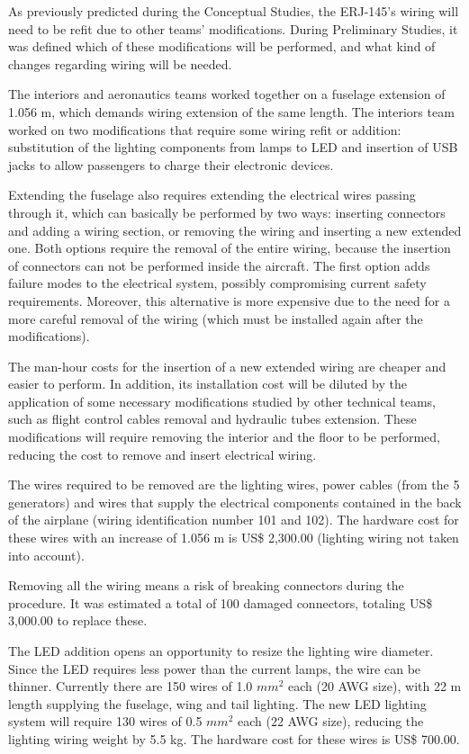 As previously predicted during the Conceptual Studies, the ERJ-145's wiring will need to be refit due to other teams' modifications. During Preliminary Studies, it was defined which of these modifications will be performed, and what kind of changes regarding wiring will be needed.

The interiors and aeronautics teams worked together on a fuselage extension of 1.056 m, which demands wiring extension of the same length. The interiors team worked on two modifications that require some wiring refit or addition: substitution of the lighting components from lamps to LED and insertion of USB jacks to allow passengers to charge their electronic devices.

Extending the fuselage also requires extending the electrical wires passing through it, which can basically be performed by two ways: inserting connectors and adding a wiring section, or removing the wiring and inserting a new extended one. Both options require the removal of the entire wiring, because the insertion of connectors can not be performed inside the aircraft. The first option adds failure modes to the electrical system, possibly compromising current safety requirements. Moreover, this alternative is more expensive due to the need for a more careful removal of the wiring (which must be installed again after the modifications).

The man-hour costs for the insertion of a new extended wiring are cheaper and easier to perform. In addition, its installation cost will be diluted by the application of some necessary modifications studied by other technical teams, such as flight control cables removal and hydraulic tubes extension. These modifications will require removing the interior and the floor to be performed, reducing the cost to remove and insert electrical wiring.

The wires required to be removed are the lighting wires, power cables (from the 5 generators) and wires that supply the electrical components contained in the back of the airplane (wiring identification number 101 and 102). The hardware cost for these wires with an increase of 1.056 m is US\$ 2,300.00 (lighting wiring not taken into account).

Removing all the wiring means a risk of breaking connectors during the procedure. It was estimated a total of 100 damaged connectors, totaling US\$ 3,000.00 to replace these.

The LED addition opens an opportunity to resize the lighting wire diameter. Since the LED requires less power than the current lamps, the wire can be thinner. Currently there are 150 wires of  1.0 $mm^{2}$ each (20 AWG size), with 22 m length supplying the fuselage, wing and tail lighting. The new LED lighting system will require 130 wires of 0.5 $mm^{2}$ each (22 AWG size), reducing the lighting wiring weight by 5.5 kg. The hardware cost for these wires is US\$ 700.00.

